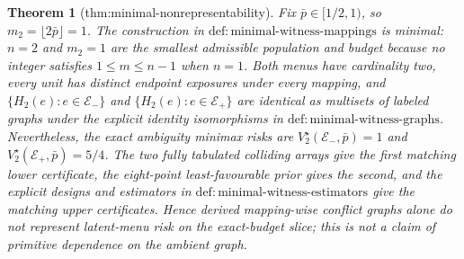 \documentclass{article}
\newtheorem{theorem}{Theorem}
\begin{document}
\begin{theorem}[thm:minimal-nonrepresentability]\label{thm:minimal-nonrepresentability}
Fix \(\bar p\in[1/2,1)\), so \(m_2=\lfloor2\bar p\rfloor=1\). The construction in \(\mathrm{def{:}minimal\text{-}witness\text{-}mappings}\) is minimal: \(n=2\) and \(m_2=1\) are the smallest admissible population and budget because no integer satisfies \(1\le m\le n-1\) when \(n=1\). Both menus have cardinality two, every unit has distinct endpoint exposures under every mapping, and \(\{H_2(e):e\in\mathcal E_-\}\) and \(\{H_2(e):e\in\mathcal E_+\}\) are identical as multisets of labeled graphs under the explicit identity isomorphisms in \(\mathrm{def{:}minimal\text{-}witness\text{-}graphs}\). Nevertheless, the exact ambiguity minimax risks are \(V_2^\star(\mathcal E_-,\bar p)=1\) and \(V_2^\star(\mathcal E_+,\bar p)=5/4\). The two fully tabulated colliding arrays give the first matching lower certificate, the eight-point least-favourable prior gives the second, and the explicit designs and estimators in \(\mathrm{def{:}minimal\text{-}witness\text{-}estimators}\) give the matching upper certificates. Hence derived mapping-wise conflict graphs alone do not represent latent-menu risk on the exact-budget slice; this is not a claim of primitive dependence on the ambient graph.
\end{theorem}
\end{document}
